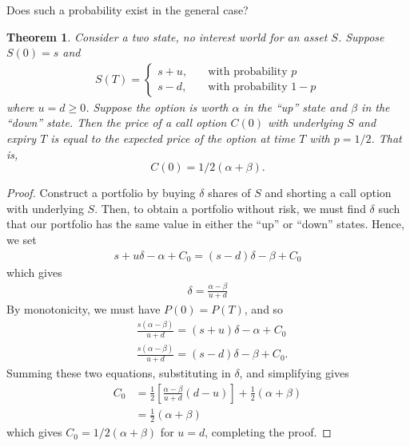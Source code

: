 \documentclass[12pt]{article}
\theoremstyle{plain}
\newtheorem{theorem}{Theorem}
\theoremstyle{definition}
\theoremstyle{remark}
\numberwithin{equation}{section}  %
\begin{document}
	Does such a probability exist in the general case?
	\begin{theorem}\label{thm:risk-neutral}
		Consider a two state, no interest world for an asset $S$. Suppose $S(0) = s$
		and 
		\begin{equation*}
			\begin{split}
				S(T) = \begin{cases}
					s + u, \quad & \text{with probability }p \\
					s - d, \quad & \text{with probability }1-p
				\end{cases}
			\end{split}
		\end{equation*}
		where $u = d \ge 0$. Suppose the option is worth $\alpha$ in the ``up'' state
		and $\beta$ in the ``down'' state.
		Then the price of a call option $C(0)$ with underlying
		$S$ and expiry $T$ is equal to the expected price of the option at time $T$
		with $p = 1/2$. That is, \[ C(0) = 1/2(\alpha + \beta). \]
	\end{theorem}
	\begin{proof}
		Construct a portfolio by buying $\delta$
		shares of $S$ and shorting a call option with underlying $S$.
		Then, to obtain a portfolio without risk, we must find $\delta$ such that
		our portfolio has the same value in either the ``up'' or ``down'' states.
		Hence, we set 
		\begin{equation*}
			\begin{split}
				s + u \delta - \alpha + C_{0} = (s - d) \delta - \beta + C_{0}
			\end{split}
		\end{equation*}
		which gives
		\begin{equation*}
			\begin{split}
				\delta = \frac{\alpha - \beta}{u + d}
			\end{split}
		\end{equation*}
		By monotonicity, we must have $P(0) = P(T)$,
		and so
		\begin{equation*}
			\begin{split}
				& \frac{s(\alpha - \beta)}{u + d} = (s + u) \delta - \alpha + C_{0} \\
				& \frac{s(\alpha - \beta)}{u + d} = (s - d) \delta - \beta + C_{0}. 
			\end{split}
		\end{equation*}
		Summing these two equations, substituting in $\delta$, and simplifying gives
		\begin{equation}\label{rn-drift}
			\begin{split}
				C_{0} & =
				\frac{1}{2} \left [ \frac{\alpha - \beta}{u + d} (d - u) \right ]
				+ \frac{1}{2}(\alpha + \beta)
				\\
				& = \frac{1}{2}(\alpha + \beta)
			\end{split}
		\end{equation}
		which gives $C_{0} = 1/2(\alpha + \beta)$ for $u = d$, completing the proof.
	\end{proof}
\end{document}
